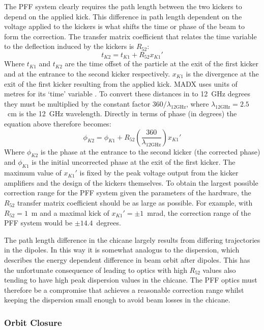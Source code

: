 The PFF system clearly requires the path length between the two kickers to depend on the applied kick. This difference in path length dependent on the voltage applied to the kickers is what shifts the time or phase of the beam to form the correction. The transfer matrix coefficient that relates the time variable to the deflection induced by the kickers is \(R_{52}\):
\begin{equation}
t_{K2} = t_{K1} + R_{52}x_{K1}'
\end{equation}
Where \(t_{K1}\) and \(t_{K2}\) are the time offset of the particle at the exit of the first kicker and at the entrance to the second kicker respectively. \(x_{K1}\) is the divergence at the exit of the first kicker resulting from the applied kick. MADX uses units of metres for its `time' variable \cite{madx}. To convert these distances in to 12~GHz degrees they must be multiplied by the constant factor \(360/\lambda_{\mathrm{12GHz}}\), where \(\lambda_{\mathrm{12GHz}} = 2.5\)~cm is the 12~GHz wavelength. Directly in terms of phase (in degrees) the equation above therefore becomes:
\begin{equation}
\phi_{K2} = \phi_{K1} + R_{52}\left(\frac{360}{\lambda_{\mathrm{12GHz}}}\right)x_{K1}'
\end{equation}
Where \(\phi_{K2}\) is the phase at the entrance to the second kicker (the corrected phase) and \(\phi_{K1}\) is the initial uncorrected phase at the exit of the first kicker. The maximum value of \(x_{K1}'\) is fixed by the peak voltage output from the kicker amplifiers and the design of the kickers themselves. To obtain the largest possible correction range for the PFF system given the parameters of the hardware, the \(R_{52}\) transfer matrix coefficient should be as large as possible. For example, with \(R_{52} = 1\)~m and a maximal kick of \(x_{K1}' = \pm 1\)~mrad, the correction range of the PFF system would be \(\pm 14.4\)~degrees.

The path length difference in the chicane largely results from differing trajectories in the dipoles. In this way it is somewhat analogus to the dispersion, which describes the energy dependent difference in beam orbit after dipoles. This has the unfortunate consequence of leading to optics with high \(R_{52}\) values also tending to have high peak dispersion values in the chicane. The PFF optics must therefore be a compromise that achieves a reasonable correction range whilst keeping the dispersion small enough to avoid beam losses in the chicane.

\subsubsection{Orbit Closure}

